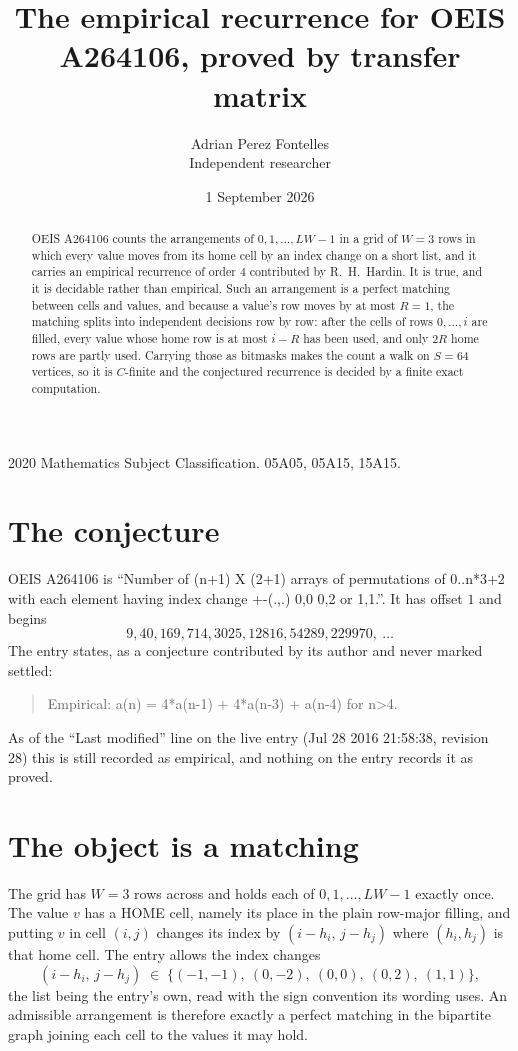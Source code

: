 \documentclass[11pt,a4paper]{article}
\title{The empirical recurrence for OEIS A264106, proved by transfer matrix}
\author{Adrian Perez Fontelles\\ \small Independent researcher}
\date{1 September 2026}
\theoremstyle{plain}
\theoremstyle{definition}
\begin{document}
\maketitle

\begin{abstract}
OEIS A264106 counts the arrangements of $0,1,\dots,LW-1$ in a grid of $W=3$ rows in which
every value moves from its home cell by an index change on a short list, and it carries an
empirical recurrence of order $4$ contributed by R.~H.~Hardin. It is true, and it is
decidable rather than empirical. Such an arrangement is a perfect matching between cells and
values, and because a value's row moves by at most $R=1$, the matching splits into
independent decisions row by row: after the cells of rows $0,\dots,i$ are filled,
every value whose home row is at most $i-R$ has been used, and only $2R$ home rows are
partly used. Carrying those as bitmasks makes the count a walk on $S=64$ vertices, so it is
$C$-finite and the conjectured recurrence is decided by a finite exact computation.
\end{abstract}

\noindent\small 2020 Mathematics Subject Classification. 05A05, 05A15, 15A15.\normalsize

\section{The conjecture}

OEIS A264106 is ``Number of (n+1) X (2+1) arrays of permutations of 0..n*3+2 with each element having index change +-(.,.) 0,0 0,2 or 1,1.''. It has offset $1$ and begins
\[
9, 40, 169, 714, 3025, 12816, 54289, 229970,\ \dots
\]
The entry states, as a conjecture contributed by its author and never marked settled:
\begin{quote}
Empirical: a(n) = 4*a(n-1) + 4*a(n-3) + a(n-4) for n>4.
\end{quote}
As of the ``Last modified'' line on the live entry (Jul 28 2016 21:58:38, revision 28) this is still
recorded as empirical, and nothing on the entry records it as proved.

\section{The object is a matching}

The grid has $W=3$ rows across and holds each of $0,1,\dots,LW-1$ exactly once. The value
$v$ has a HOME cell, namely its place in the plain row-major filling, and putting $v$ in cell
$(i,j)$ changes its index by $(i-h_i,\,j-h_j)$ where $(h_i,h_j)$ is that home cell. The entry
allows the index changes
\[
(i-h_i,\,j-h_j)\;\in\;\{(-1,-1),\ (0,-2),\ (0,0),\ (0,2),\ (1,1)\},
\]
the list being the entry's own, read with the sign convention its wording uses. An admissible
arrangement is therefore exactly a perfect matching in the bipartite graph joining each cell to
the values it may hold.
\end{document}
